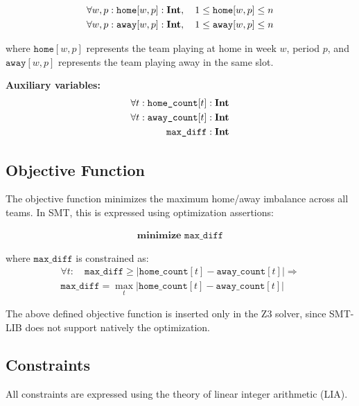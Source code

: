 \documentclass[11pt]{article}
\begin{document}
\begin{align}
    \forall w, p:\space\texttt{home}[w,p] &: \textbf{Int}, \quad 1 \leq \texttt{home}[w,p] \leq n \\
    \forall w, p:\space\texttt{away}[w,p] &: \textbf{Int}, \quad 1 \leq \texttt{away}[w,p] \leq n
\end{align}

where $\texttt{home}[w,p]$ represents the team playing at home in week $w$, period $p$, and $\texttt{away}[w,p]$ represents the team playing away in the same slot.

\textbf{Auxiliary variables:}
\begin{align}
\forall t:\space\texttt{home\_count}[t] &: \textbf{Int}  \\
\forall t:\space\texttt{away\_count}[t] &: \textbf{Int}  \\
\texttt{max\_diff} &: \textbf{Int}
\end{align}

\subsection{Objective Function}

The objective function minimizes the maximum home/away imbalance across all teams. In SMT, this is expressed using optimization assertions:

\begin{align}
\textbf{minimize } \texttt{max\_diff}
\end{align}

where $\texttt{max\_diff}$ is constrained as:
\begin{align}
\forall t: \quad \texttt{max\_diff} \geq |\texttt{home\_count}[t] - \texttt{away\_count}[t]| \Rightarrow \\
\texttt{max\_diff} = \max_{t} |\texttt{home\_count}[t] - \texttt{away\_count}[t]|
\end{align}

The above defined objective function is inserted only in the Z3 solver, since SMT-LIB does not support natively the optimization.

\subsection{Constraints}

All constraints are expressed using the theory of linear integer arithmetic (LIA).
\end{document}
